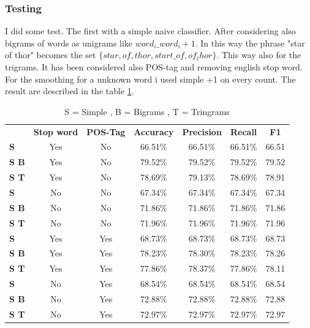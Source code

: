 \documentclass[a4paper,8pt,oneside]{article}
\begin{document}
		\subsubsection{Testing}
			I did some test. The first with a simple naive classifier. After considering also bigrams of words as unigrams like $word_i\_word_i+1$. In this way the phrase "star of thor" becomes the set $\{star,of,thor,start\_of,of_thor\}$. This way also for the trigrams. It has been considered also POS-tag and removing english stop word. For the smoothing for a unknown word i used simple +1 on every count.
			The result are described in the table \ref{bayes}.
			\begin{table}[h]
			\begin{tabular}{lcccccc}
			                              & \textbf{Stop word} & \textbf{POS-Tag} & \textbf{Accuracy} & \textbf{Precision} & \textbf{Recall} & \textbf{F1} \\
			\textbf{S}               & Yes                & No               & 66.51\%           & 66.51\%            & 66.51\%         & 66.51             \\
			\textbf{S B}  & Yes                & No               & 79.52\%           & 79.52\%            & 79.52\%         & 79.52             \\
			\textbf{S T} & Yes                & No               & 78.69\%           & 79.13\%            & 78.69\%         & 78.91             \\
			\textbf{S}               & No                 & No               & 67.34\%           & 67.34\%            & 67.34\%         & 67.34             \\
			\textbf{S B}  & No                 & No               & 71.86\%           & 71.86\%            & 71.86\%         & 71.86             \\
			\textbf{S T} & No                 & No               & 71.96\%           & 71.96\%            & 71.96\%         & 71.96             \\
			\textbf{S}               & Yes                & Yes              & 68.73\%           & 68.73\%            & 68.73\%         & 68.73             \\
			\textbf{S B}  & Yes                & Yes              & 78.23\%           & 78.30\%            & 78.23\%         & 78.26             \\
			\textbf{S T} & Yes                & Yes              & 77.86\%           & 78.37\%            & 77.86\%         & 78.11             \\
			\textbf{S}               & No                 & Yes              & 68.54\%           & 68.54\%            & 68.54\%         & 68.54             \\
			\textbf{S B}  & No                 & Yes              & 72.88\%           & 72.88\%            & 72.88\%         & 72.88             \\
			\textbf{S T} & No                 & Yes              & 72.97\%           & 72.97\%            & 72.97\%         & 72.97            
			\end{tabular}
			\caption{ S = Simple , B = Bigrams , T = Tringrams }
			\label{bayes}
			\end{table}
\end{document}
